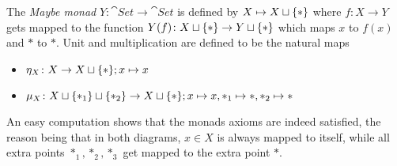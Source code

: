 \begin{example}
    The \textit{Maybe monad} $Y \colon \cat{Set} \to \cat{Set}$ is defined by
    $X \mapsto X \sqcup \{\ast\}$ where $f \colon X \to Y$ gets mapped to the function
    $Y(f) \colon X \sqcup \{\ast\} \to Y \sqcup \{\ast\}$ which maps $x$ to $f(x)$ and $\ast$ to $\ast$. 
    Unit and multiplication are defined to be the natural maps
    \begin{itemize}
        \item $\eta_X \colon X \to X \sqcup \{\ast\}; x \mapsto x$
        \item $\mu_X \colon X \sqcup \{\ast_1\}  \sqcup \{\ast_2\} \to X \sqcup \{\ast\}; x \mapsto x, 
        \ast_1 \mapsto \ast, \ast_2 \mapsto \ast$
    \end{itemize}
    An easy computation shows that the monads axioms are indeed satisfied,
    the reason being that in both diagrams, $x \in X$ is always mapped to itself,
    while all extra points $\ast_1,\ast_2,\ast_3$ get mapped to the extra point $\ast$.
\end{example}

